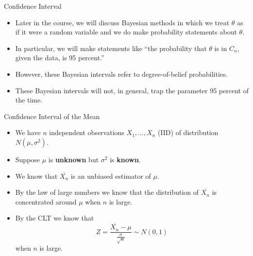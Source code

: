 \documentclass[handout]{beamer}
\begin{document}
\begin{frame}{Confidence Interval}
\scriptsize{


\begin{itemize}
 \item Later in the course, we will discuss Bayesian methods in which we treat $\theta$ as if it were a random variable and we do make probability statements about $\theta$.
\item In particular, we will make statements like ``the probability that $\theta$  is in $C_n$, given the data, is 95 percent.''
\item However, these Bayesian intervals refer to degree-of-belief probabilities. 
\item These Bayesian intervals will not, in general, trap the parameter 95 percent of the time.
 
\end{itemize}



}
 
\end{frame}


\begin{frame}{Confidence Interval of the Mean }
\scriptsize{
\begin{itemize}
 \item We have $n$ independent observations $X_1, \dots, X_n$ (IID) of distribution $N(\mu,\sigma^2)$.
\item Suppose $\mu$ is \textbf{unknown} but $\sigma^2$ is \textbf{known}.
 \item We know that $\overline{X_{n}}$ is an unbiased estimator of $\mu$.
 \item By the law of large numbers we know that the distribution of $\overline{X_{n}}$ is concentrated around $\mu$ when $n$ is large.
 \item By the CLT we know that \begin{displaymath}
 Z=\frac{\overline{X_{n}}-\mu}{\frac{\sigma}{\sqrt{n}}}  \sim N(0,1)
\end{displaymath}
when $n$ is large.
\end{itemize}


 }
\end{frame}
\end{document}
